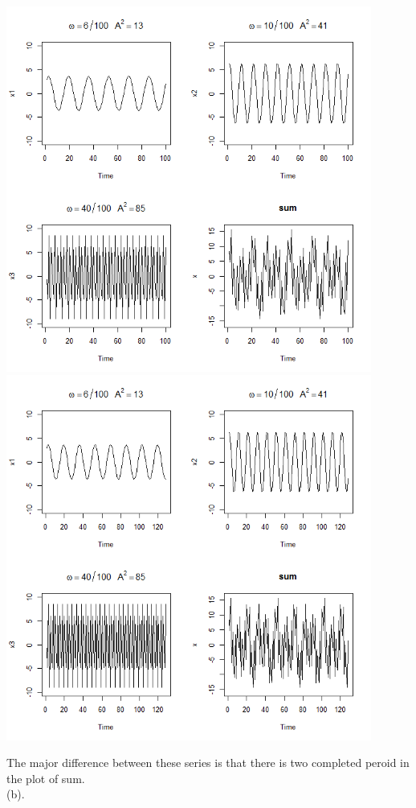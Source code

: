 \documentclass{article}
\begin{document}
\begin{CJK*}{GBK}{song}
\begin{enumerate}
\begin{center}
	\includegraphics[width=12cm]{1.png}
	\includegraphics[width=12cm]{2.png}
	\end{center}
	The major difference between these series is that there is two completed peroid in the plot of sum.\\
	(b).\begin{center}

\end{center}
\end{enumerate}
\end{CJK*}
\end{document}
